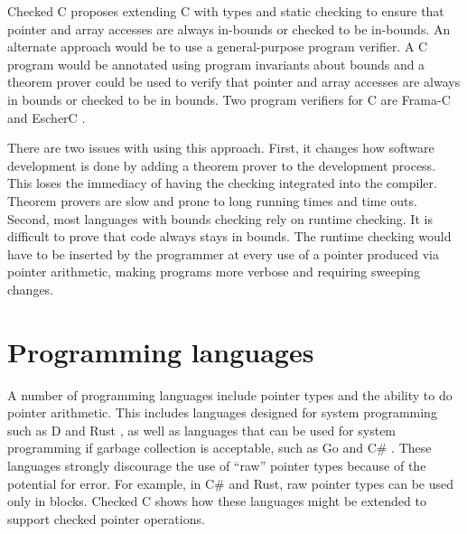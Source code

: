 Checked C proposes extending C with types and static checking to ensure
that pointer and array accesses are always in-bounds or checked to be in-bounds. 
An alternate approach would be to use a general-purpose program verifier.
A C program would be annotated using program invariants about bounds and a 
theorem prover could be used to verify that pointer and array accesses are
always in bounds or checked to be in bounds.  Two program verifiers
for C are Frama-C \cite{FramaC2016} and EscherC \cite{Escher2016}.   

There are two issues with using this approach.  First, it changes how software
development is done by adding a theorem prover to the development process.
This loses the immediacy of having the checking integrated into the compiler.
Theorem provers are slow and prone to long running times and time outs.
Second, most languages with bounds checking rely on runtime checking.  It is difficult
to prove that code always stays in bounds.  The runtime checking would have to be
inserted by the programmer at every use of a pointer produced via pointer 
arithmetic, making programs more verbose and requiring sweeping changes.

\section{Programming languages}

A number of programming languages include pointer types and the ability
to do pointer arithmetic.  This includes languages designed for system
programming such as D \cite{D2016} and Rust \cite{Rust2016}, as well as languages 
that can be  used for system programming if garbage collection is acceptable, 
such as Go \cite{Go2016} and C\# \cite{Csharp2016}.   
These languages strongly discourage the use of ``raw'' pointer
types because of the potential for error.  For example, in C\# and Rust, 
raw pointer types can be used only in  blocks.  Checked C shows
how these languages might be extended to support checked pointer operations.

